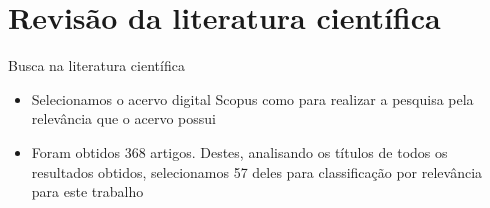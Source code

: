 \documentclass[brazilian]{beamer}
\begin{document}
\section{Revisão da literatura científica}



\begin{frame}{Busca na literatura científica}
    \begin{itemize}
        \item Selecionamos o acervo digital Scopus como para realizar a pesquisa pela relevância que o acervo possui
        \item Foram obtidos 368 artigos. Destes, analisando os títulos de todos os resultados obtidos, selecionamos 57 deles para classificação por relevância para este trabalho
    \end{itemize}
\end{frame}
\end{document}
